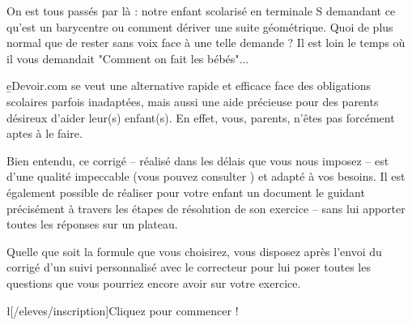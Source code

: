 On est tous passés par là : notre enfant scolarisé en terminale S demandant ce qu'est un barycentre ou comment dériver une suite géométrique. Quoi de plus normal que de rester sans voix face à une telle demande ? Il est loin le temps où il vous demandait "Comment on fait les bébés"...

\b{eDevoir.com} se veut une alternative rapide et efficace face des obligations scolaires parfois inadaptées, mais aussi une aide précieuse pour des parents désireux d'aider leur(s) enfant(s). En effet, vous, parents, n'êtes pas forcément aptes à le faire.

Bien entendu, ce corrigé -- réalisé dans les délais que vous nous imposez -- est d'une qualité impeccable (vous pouvez consulter ) et adapté à vos besoins. Il est également possible de réaliser pour votre enfant un document le guidant précisément à travers les étapes de résolution de son exercice -- sans lui apporter toutes les réponses sur un plateau.

Quelle que soit la formule que vous choisirez, vous disposez après l'envoi du corrigé d'un suivi personnalisé avec le correcteur pour lui poser toutes les questions que vous pourriez encore avoir sur votre exercice.

\l[/eleves/inscription]{Cliquez pour commencer !}